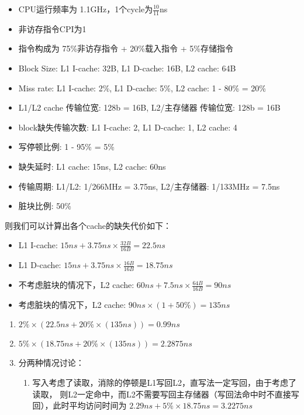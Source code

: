 \documentclass{article}
\begin{document}
\begin{enumerate}[label=\arabic*.]
\begin{itemize}
            \item CPU运行频率为 1.1GHz，1个cycle为$\frac{10}{11}$ns
            \item 非访存指令CPI为1
            \item 指令构成为 75\%非访存指令 + 20\%载入指令 + 5\%存储指令
            \item Block Size: L1 I-cache: 32B, L1 D-cache: 16B, L2 cache: 64B
            \item Miss rate: L1 I-cache: 2\%, L1 D-cache: 5\%, L2 cache: 1 - 80\% = 20\%
            \item L1/L2 cache 传输位宽: 128b = 16B, L2/主存储器 传输位宽: 128b = 16B
            \item block缺失传输次数: L1 I-cache: 2, L1 D-cache: 1, L2 cache: 4
            \item 写停顿比例: 1 - 95\% = 5\%
            \item 缺失延时: L1 cache: 15ns, L2 cache: 60ns
            \item 传输周期: L1/L2: 1/266MHz = 3.75ns, L2/主存储器: 1/133MHz = 7.5ns
            \item 脏块比例: 50\%
        \end{itemize}
        则我们可以计算出各个cache的缺失代价如下：
        \begin{itemize}
            \item L1 I-cache: $15ns + 3.75ns \times \frac{32B}{16B} = 22.5ns$
            \item L1 D-cache: $15ns + 3.75ns \times \frac{16B}{16B} = 18.75ns$
            \item 不考虑脏块的情况下，L2 cache: $60ns + 7.5ns \times \frac{64B}{16B} = 90ns$
            \item 考虑脏块的情况下，L2 cache: $90ns \times (1 + 50\%) = 135ns$
        \end{itemize}
        \begin{enumerate}[label=\alph*.]
            \item $2\% \times (22.5ns + 20\% \times (135ns)) = 0.99ns$
            \item $5\% \times (18.75ns + 20\% \times (135ns)) = 2.2875ns$
            \item 分两种情况讨论：
            \begin{enumerate}[label=\roman*.]
                \item 写入考虑了读取，消除的停顿是L1写回L2，直写法一定写回，由于考虑了读取，
                则L2一定命中，而L2不需要写回主存储器（写回法命中时不直接写回），此时平均访问时间为
                $2.29ns + 5\% \times 18.75ns = 3.2275ns$

\end{enumerate}
\end{enumerate}
\end{enumerate}
\end{document}
